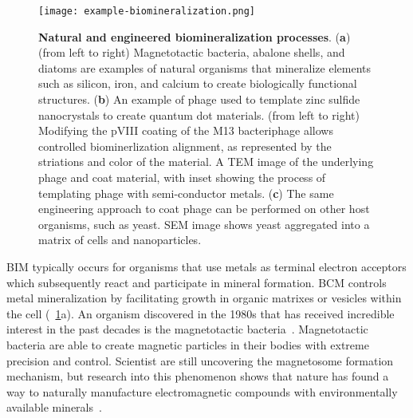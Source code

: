 \documentclass[../main/main]{subfiles}
\begin{document}
\begin{figure}[H]
	\centering
	\texttt{[image: example-biomineralization.png]}
	\caption[Natural and engineered biomineralization processes]
	{
		\textbf{Natural and engineered biomineralization processes}\protect\footnotemark.
    (\textbf{a}) (from left to right) Magnetotactic bacteria, abalone shells, and diatoms are examples of natural organisms that mineralize elements such as silicon, iron, and calcium to create biologically functional structures.
    (\textbf{b}) An example of phage used to template zinc sulfide nanocrystals to create quantum dot materials. (from left to right) Modifying the pVIII coating of the M13 bacteriphage allows controlled biominerlization alignment, as represented by the striations and color of the material. A TEM image of the underlying phage and coat material, with inset showing the process of templating phage with semi-conductor metals.
    (\textbf{c}) The same engineering approach to coat phage can be performed on other host organisms, such as yeast. SEM image shows yeast aggregated into a matrix of cells and  nanoparticles.
	}
	\label{figure:chapter1:example-biomineralization-bio}
\end{figure}
\newpage %

BIM typically occurs for organisms that use metals as terminal electron acceptors which subsequently react and participate in mineral formation. BCM controls metal mineralization by facilitating growth in organic matrixes or vesicles within the cell (\FIGURE~\ref{figure:chapter1:example-biomineralization-bio}a). An organism discovered in the 1980s that has received incredible interest in the past decades is the magnetotactic bacteria~\cite{blakemore1982}. Magnetotactic bacteria are able to create magnetic particles in their bodies with extreme precision and control. Scientist are still uncovering the magnetosome formation mechanism, but research into this phenomenon shows that nature has found a way to naturally manufacture electromagnetic compounds with environmentally available minerals~\cite{uebe2016magnetosome}.
\end{document}

